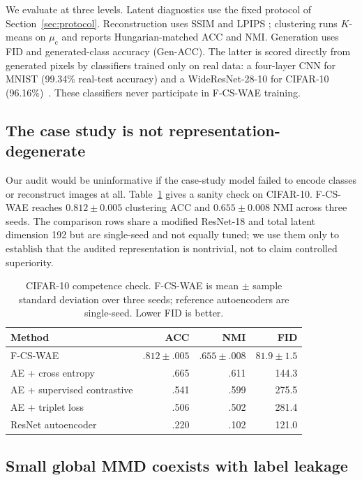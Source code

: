 \documentclass{article}
\newcommand{\ours}{F-CS-WAE}
\newcommand{\muc}{\mu_{\mathrm{c}}}
\begin{document}
We evaluate at three levels.  Latent diagnostics use the fixed protocol of
Section~\ref{sec:protocol}.  Reconstruction uses SSIM and LPIPS
\citep{zhang2018unreasonable}; clustering runs $K$-means on $\muc$ and reports
Hungarian-matched ACC and NMI.  Generation uses FID
\citep{heusel2017gans} and generated-class accuracy (Gen-ACC).  The latter is
scored directly from generated pixels by classifiers trained only on real
data: a four-layer CNN for MNIST (99.34\% real-test accuracy) and a
WideResNet-28-10 for CIFAR-10 (96.16\%)~\citep{zagoruyko2016wide}.  These
classifiers never participate in \ours{} training.

\subsection{The case study is not representation-degenerate}

Our audit would be uninformative if the case-study model failed to encode
classes or reconstruct images at all.  Table~\ref{tab:competence} gives a
sanity check on CIFAR-10.  \ours{} reaches
$0.812\pm0.005$ clustering ACC and $0.655\pm0.008$ NMI across three seeds.
The comparison rows share a modified ResNet-18 and total latent dimension 192
but are single-seed and not equally tuned; we use them only to establish that
the audited representation is nontrivial, not to claim controlled
superiority.

\begin{table}[ht]
\caption{CIFAR-10 competence check.  \ours{} is mean $\pm$ sample standard
deviation over three seeds; reference autoencoders are single-seed.  Lower
FID is better.}
\label{tab:competence}
\centering
\small
\begin{tabular}{lrrr}
\toprule
Method & ACC & NMI & FID \\
\midrule
\ours{} & $.812\pm.005$ & $.655\pm.008$ & $81.9\pm1.5$ \\
AE + cross entropy & .665 & .611 & 144.3 \\
AE + supervised contrastive & .541 & .599 & 275.5 \\
AE + triplet loss & .506 & .502 & 281.4 \\
ResNet autoencoder & .220 & .102 & 121.0 \\
\bottomrule
\end{tabular}
\end{table}
\FloatBarrier

\subsection{Small global MMD coexists with label leakage}
\end{document}
